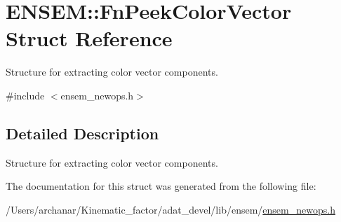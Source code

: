 \hypertarget{structENSEM_1_1FnPeekColorVector}{}\section{E\+N\+S\+EM\+:\+:Fn\+Peek\+Color\+Vector Struct Reference}
\label{structENSEM_1_1FnPeekColorVector}


Structure for extracting color vector components.  




{\ttfamily \#include $<$ensem\+\_\+newops.\+h$>$}



\subsection{Detailed Description}
Structure for extracting color vector components. 

The documentation for this struct was generated from the following file\+:\begin{DoxyCompactItemize}
\item 
/\+Users/archanar/\+Kinematic\+\_\+factor/adat\+\_\+devel/lib/ensem/\mbox{\hyperlink{lib_2ensem_2ensem__newops_8h}{ensem\+\_\+newops.\+h}}\end{DoxyCompactItemize}
